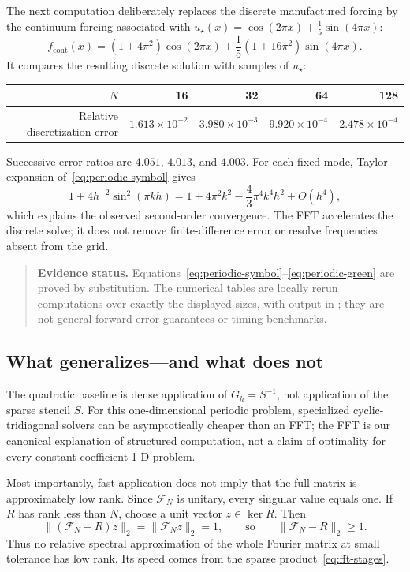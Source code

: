 \documentclass[11pt,a4paper]{article}
\newenvironment{evidence}{\begin{quote}\small\color{muted}\textbf{Evidence status.} }{\end{quote}}
\begin{document}
The next computation deliberately replaces the discrete manufactured forcing by the continuum forcing associated with $u_\star(x)=\cos(2\pi x)+\tfrac15\sin(4\pi x)$:
\[
 f_{\mathrm{cont}}(x)=(1+4\pi^2)\cos(2\pi x)
 +\frac15(1+16\pi^2)\sin(4\pi x).
\]
It compares the resulting discrete solution with samples of $u_\star$:
\begin{center}
\begin{tabular}{@{}rrrrr@{}}
\toprule
$N$ & 16 & 32 & 64 & 128\\
\midrule
Relative discretization error & $1.613\times10^{-2}$ & $3.980\times10^{-3}$ & $9.920\times10^{-4}$ & $2.478\times10^{-4}$\\
\bottomrule
\end{tabular}
\end{center}
Successive error ratios are $4.051$, $4.013$, and $4.003$. For each fixed mode, Taylor expansion of~\eqref{eq:periodic-symbol} gives
\[
 1+4h^{-2}\sin^2(\pi kh)
 =1+4\pi^2k^2-\frac43\pi^4k^4h^2+O(h^4),
\]
which explains the observed second-order convergence. The FFT accelerates the discrete solve; it does not remove finite-difference error or resolve frequencies absent from the grid.
\begin{evidence}
Equations~\eqref{eq:periodic-symbol}--\eqref{eq:periodic-green} are proved by substitution. The numerical tables are locally rerun computations over exactly the displayed sizes, with output in ; they are not general forward-error guarantees or timing benchmarks.
\end{evidence}

\subsection{What generalizes---and what does not}
The quadratic baseline is dense application of $G_h=S^{-1}$, not application of the sparse stencil $S$. For this one-dimensional periodic problem, specialized cyclic-tridiagonal solvers can be asymptotically cheaper than an FFT; the FFT is our canonical explanation of structured computation, not a claim of optimality for every constant-coefficient 1-D problem.

Most importantly, fast application does not imply that the full matrix is approximately low rank. Since $\mathcal F_N$ is unitary, every singular value equals one. If $R$ has rank less than $N$, choose a unit vector $z\in\ker R$. Then
\begin{equation}
 \|(\mathcal F_N-R)z\|_2=\|\mathcal F_Nz\|_2=1,
 \qquad\text{so}\qquad \|\mathcal F_N-R\|_2\ge1.
 \label{eq:fft-full-rank}
\end{equation}
Thus no relative spectral approximation of the whole Fourier matrix at small tolerance has low rank. Its speed comes from the sparse product~\eqref{eq:fft-stages}.
\end{document}

